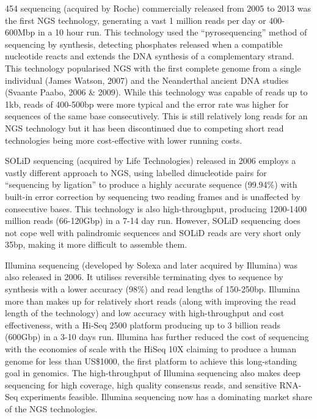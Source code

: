 
454 sequencing (acquired by Roche) commercially released from 2005 to 2013 was the first NGS technology, generating a vast 1 million reads per day or 400-600Mbp in a 10 hour run. This technology used the ``pyrosequencing'' method of sequencing by synthesis, detecting phosphates released when a compatible nucleotide reacts and extends the DNA synthesis of a complementary strand. This technology popularised NGS with the first complete genome from a single individual (James Watson, 2007) and the Neanderthal ancient DNA studies (Svaante Paabo, 2006 \& 2009). While this technology was capable of reads up to 1kb, reads of 400-500bp were more typical and the error rate was higher for sequences of the same base consecutively. This is still relatively long reads for an NGS technology but it has been discontinued due to competing short read technologies being more cost-effective with lower running costs.

SOLiD sequencing (acquired by Life Technologies) released in 2006 employs a vastly different approach to NGS, using labelled dinucleotide pairs for ``sequencing by ligation'' to produce a highly accurate sequence (99.94\%) with built-in error correction by sequencing two reading frames and is unaffected by consecutive bases. This technology is also high-throughput, producing 1200-1400 million reads (66-120Gbp) in a 7-14 day run. However, SOLiD sequencing does not cope well with palindromic sequences and SOLiD reads are very short only 35bp, making it more difficult to assemble them.

Illumina sequencing (developed by Solexa and later acquired by Illumina) was also released in 2006. It utilises reversible terminating dyes to sequence by synthesis with a lower accuracy (98\%) and read lengths of 150-250bp. Illumina more than makes up for relatively short reads (along with improving the read length of the technology) and low accuracy with high-throughput and cost effectiveness, with a Hi-Seq 2500 platform producing up to 3 billion reads (600Gbp) in a 3-10 days run. Illumina has further reduced the cost of sequencing with the economies of scale with the HiSeq 10X claiming to produce a human genome for less than US\$1000, the first platform to achieve this long-standing goal in genomics. The high-throughput of Illumina sequencing also makes deep sequencing for high coverage, high quality consensus reads, and sensitive RNA-Seq experiments feasible. Illumina sequencing now has a dominating market share of the NGS technologies.

